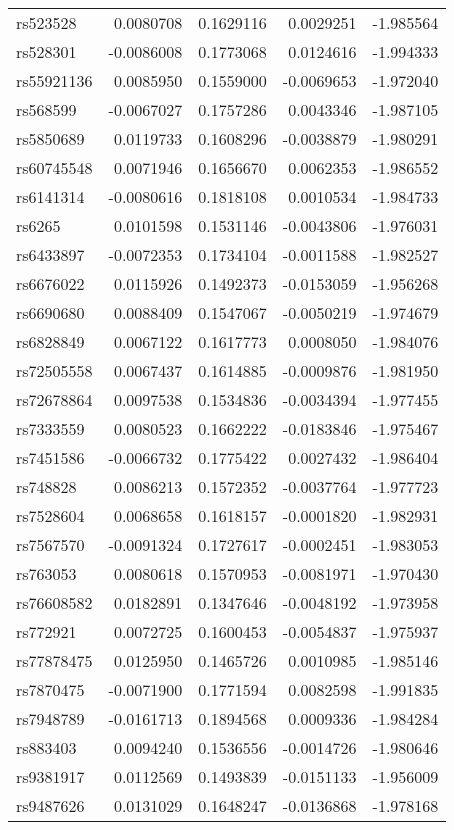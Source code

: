 \documentclass[AMA,STIX1COL,]{WileyNJD-v2}
\begin{document}
\begin{longtable}[t]{lrrrr}
rs523528 & 0.0080708 & 0.1629116 & 0.0029251 & -1.985564\\
rs528301 & -0.0086008 & 0.1773068 & 0.0124616 & -1.994333\\
rs55921136 & 0.0085950 & 0.1559000 & -0.0069653 & -1.972040\\
rs568599 & -0.0067027 & 0.1757286 & 0.0043346 & -1.987105\\
rs5850689 & 0.0119733 & 0.1608296 & -0.0038879 & -1.980291\\
\addlinespace
rs60745548 & 0.0071946 & 0.1656670 & 0.0062353 & -1.986552\\
rs6141314 & -0.0080616 & 0.1818108 & 0.0010534 & -1.984733\\
rs6265 & 0.0101598 & 0.1531146 & -0.0043806 & -1.976031\\
rs6433897 & -0.0072353 & 0.1734104 & -0.0011588 & -1.982527\\
rs6676022 & 0.0115926 & 0.1492373 & -0.0153059 & -1.956268\\
\addlinespace
rs6690680 & 0.0088409 & 0.1547067 & -0.0050219 & -1.974679\\
rs6828849 & 0.0067122 & 0.1617773 & 0.0008050 & -1.984076\\
rs72505558 & 0.0067437 & 0.1614885 & -0.0009876 & -1.981950\\
rs72678864 & 0.0097538 & 0.1534836 & -0.0034394 & -1.977455\\
rs7333559 & 0.0080523 & 0.1662222 & -0.0183846 & -1.975467\\
\addlinespace
rs7451586 & -0.0066732 & 0.1775422 & 0.0027432 & -1.986404\\
rs748828 & 0.0086213 & 0.1572352 & -0.0037764 & -1.977723\\
rs7528604 & 0.0068658 & 0.1618157 & -0.0001820 & -1.982931\\
rs7567570 & -0.0091324 & 0.1727617 & -0.0002451 & -1.983053\\
rs763053 & 0.0080618 & 0.1570953 & -0.0081971 & -1.970430\\
\addlinespace
rs76608582 & 0.0182891 & 0.1347646 & -0.0048192 & -1.973958\\
rs772921 & 0.0072725 & 0.1600453 & -0.0054837 & -1.975937\\
rs77878475 & 0.0125950 & 0.1465726 & 0.0010985 & -1.985146\\
rs7870475 & -0.0071900 & 0.1771594 & 0.0082598 & -1.991835\\
rs7948789 & -0.0161713 & 0.1894568 & 0.0009336 & -1.984284\\
\addlinespace
rs883403 & 0.0094240 & 0.1536556 & -0.0014726 & -1.980646\\
rs9381917 & 0.0112569 & 0.1493839 & -0.0151133 & -1.956009\\
rs9487626 & 0.0131029 & 0.1648247 & -0.0136868 & -1.978168\\*
\end{longtable}
\end{document}
